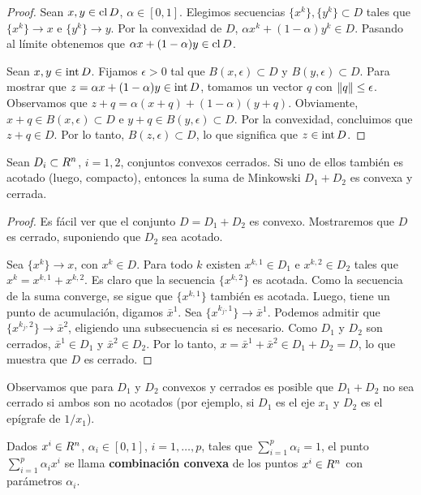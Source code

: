 \begin{proof}
 Sean $x, y \in \operatorname{cl} D$, $\alpha \in [0, 1]$. Elegimos secuencias $\{x^k\}, \{y^k\} \subset D$ tales que $\{x^k\} \to x$ e $\{y^k\} \to y$. Por la convexidad de $D$, $\alpha x^k + (1 - \alpha)y^k \in D$. Pasando al límite obtenemos que $\alpha x + (1 - \alpha)y \in \operatorname{cl} D$.
 
 Sean $x, y \in \operatorname{\operatorname{int}} D$. Fijamos $\epsilon > 0$ tal que $B(x, \epsilon) \subset D$ y $B(y, \epsilon) \subset D$. Para mostrar que $z = \alpha x + (1 - \alpha)y \in \operatorname{\operatorname{int}} D$, tomamos un vector $q$ con $\lVert q\rVert \leq \epsilon$. Observamos que $z + q = \alpha(x + q) + (1 - \alpha)(y + q)$. Obviamente, $x + q \in B(x, \epsilon) \subset D$ e $y + q \in B(y, \epsilon) \subset D$. Por la convexidad, concluimos que $z + q \in D$. Por lo tanto, $B(z, \epsilon) \subset D$, lo que significa que $z \in \operatorname{\operatorname{int}} D$.
\end{proof}

\begin{proposition}\label{v1:prop:3.2.3}
 Sean $D_i \subset R^n$, $i = 1, 2$, conjuntos convexos cerrados. Si uno de ellos también es acotado (luego, compacto), entonces la suma de Minkowski $D_1 + D_2$ es convexa y cerrada.
\end{proposition}

\begin{proof}
 Es fácil ver que el conjunto $D = D_1 + D_2$ es convexo. Mostraremos que $D$ es cerrado, suponiendo que $D_2$ sea acotado.
 
 Sea $\{x^k\} \to x$, con $x^k \in D$. Para todo $k$ existen $x^{k,1} \in D_1$ e $x^{k,2} \in D_2$ tales que $x^k = x^{k,1} + x^{k,2}$. Es claro que la secuencia $\{x^{k,2}\}$ es acotada. Como la secuencia de la suma converge, se sigue que $\{x^{k,1}\}$ también es acotada. Luego, tiene un punto de acumulación, digamos $\bar{x}^1$. Sea $\{x^{k_j,1}\} \to \bar{x}^1$. Podemos admitir que $\{x^{k_j,2}\} \to \bar{x}^2$, eligiendo una subsecuencia si es necesario. Como $D_1$ y $D_2$ son cerrados, $\bar{x}^1 \in D_1$ y $\bar{x}^2 \in D_2$. Por lo tanto, $x = \bar{x}^1 + \bar{x}^2 \in D_1 + D_2 = D$, lo que muestra que $D$ es cerrado.
\end{proof}

Observamos que para $D_1$ y $D_2$ convexos y cerrados es posible que $D_1 + D_2$ no sea cerrado si ambos son no acotados (por ejemplo, si $D_1$ es el eje $x_1$ y $D_2$ es el epígrafe de $1/x_1$).

\begin{definition}\label{v1:def:3.2.1}
 Dados $x^i \in R^n$, $\alpha_i \in [0, 1]$, $i = 1, \dots, p$, tales que $\sum_{i=1}^p \alpha_i = 1$, el punto $\sum_{i=1}^p \alpha_i x^i$ se llama \textbf{combinación convexa} de los puntos $x^i \in R^n$ con parámetros $\alpha_i$.
\end{definition}

